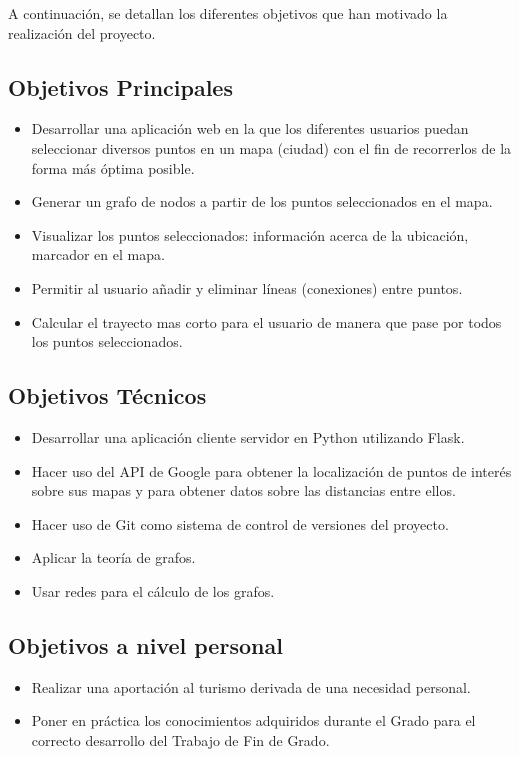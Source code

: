 
A continuación, se detallan los diferentes objetivos que han motivado la realización del proyecto.

\subsection{Objetivos Principales}

\begin{itemize}
	\item Desarrollar una aplicación web en la que los diferentes usuarios puedan seleccionar diversos puntos en un mapa (ciudad) con el fin de recorrerlos de la forma más óptima posible.
	\item Generar un grafo de nodos a partir de los puntos seleccionados en el mapa.
	\item Visualizar los puntos seleccionados: información acerca de la ubicación, marcador en el mapa.
	\item Permitir al usuario añadir y eliminar líneas (conexiones) entre puntos.
	\item Calcular el trayecto mas corto para el usuario de manera que pase por todos los puntos seleccionados.
\end{itemize}

\subsection{Objetivos Técnicos}
\begin{itemize}
	\item Desarrollar una aplicación cliente servidor en Python utilizando Flask.
	\item Hacer uso del API de Google para obtener la localización de puntos de interés sobre sus mapas y para obtener datos sobre las distancias entre ellos.
	\item Hacer uso de Git como sistema de control de versiones del proyecto.
	\item Aplicar la teoría de grafos.
	\item Usar redes para el cálculo de los grafos.
\end{itemize}
\subsection{Objetivos a nivel personal}
\begin{itemize}
	\item Realizar una aportación al turismo derivada de una necesidad personal.
	\item Poner en práctica los conocimientos adquiridos durante el Grado para el correcto desarrollo del Trabajo de Fin de Grado.
\end{itemize}
